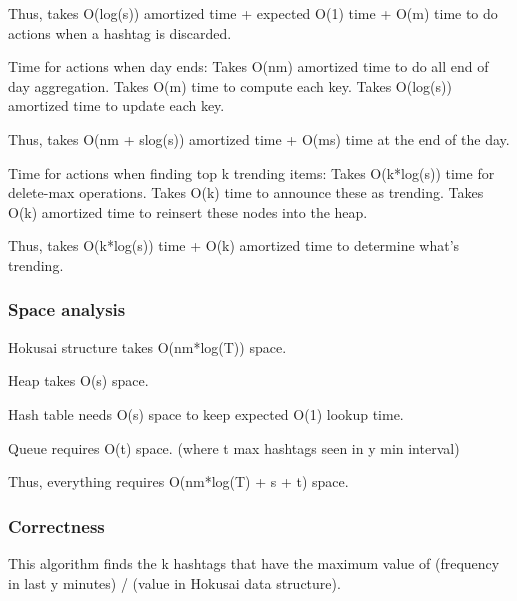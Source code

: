 \documentclass[a4paper,12pt]{article}
\begin{document}
Thus, takes O(log(s)) amortized time + expected O(1) time  + O(m) time to do actions when a hashtag is discarded.
			

Time for actions when day ends:
Takes O(nm) amortized time to do all end of day aggregation.
Takes O(m) time to compute each key.
Takes O(log(s)) amortized time to update each key.

Thus, takes O(nm + slog(s)) amortized time + O(ms) time at the end of the day.

Time for actions when finding top k trending items:
	Takes O(k*log(s)) time for delete-max operations.
	Takes O(k) time to announce these as trending.
Takes O(k) amortized time to reinsert these nodes into the heap.

Thus, takes O(k*log(s)) time + O(k) amortized time to determine what’s trending.



\subsubsection{Space analysis}

Hokusai structure takes O(nm*log(T)) space.

Heap takes O(s) space.

Hash table needs O(s) space to keep expected O(1) lookup time.

Queue requires O(t) space. (where t max hashtags seen in y min interval)

Thus, everything requires O(nm*log(T) + s + t) space.

\subsubsection{Correctness \label{Correct}}

This algorithm finds the k hashtags that have the maximum value of (frequency in last y minutes) / (value in Hokusai data structure).
\end{document}

